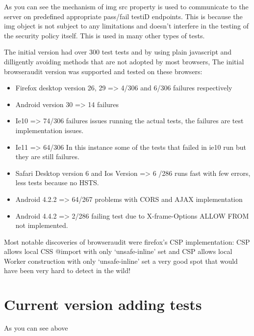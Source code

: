 As you can see the mechanism of img src property is used to communicate to the server on predefined appropriate pass/fail testiD endpoints. This is because 
the img object is not subject to any limitations and doesn't interfere in the testing of the security policy itself. This is used in many other types of tests.

The initial version had over 300 test tests and by using plain javascript and dilligently avoiding methods that are not adopted by most browsers,
The initial browseraudit version was supported and tested on these browsers:

\begin{itemize}
 \item Firefox desktop version 26, 29 => 4/306 and 6/306 failures respectively
 \item Android version 30 => 14 failures
 \item Ie10 => 74/306 failures issues running the actual tests, the failures are test implementation issues.
 \item Ie11  => 64/306 In this instance some of the tests that failed in ie10 run but they are still failures.
 \item Safari Desktop version 6 and Ios Version => 6 /286 runs fast with few errors, less tests because no HSTS.
 \item Android 4.2.2 => 64/267 problems with CORS and AJAX implementation
 \item Android 4.4.2 => 2/286 failing test due to X-frame-Options ALLOW FROM not implemented.
\end{itemize}

Most notable discoveries of browseraudit were firefox's CSP implementation: CSP allows local CSS @import with only `unsafe-inline' set and 
CSP allows local Worker construction with only `unsafe-inline' set a very good spot that would have been very hard to detect in the wild!

\section{Current version adding tests}

As you can see above  